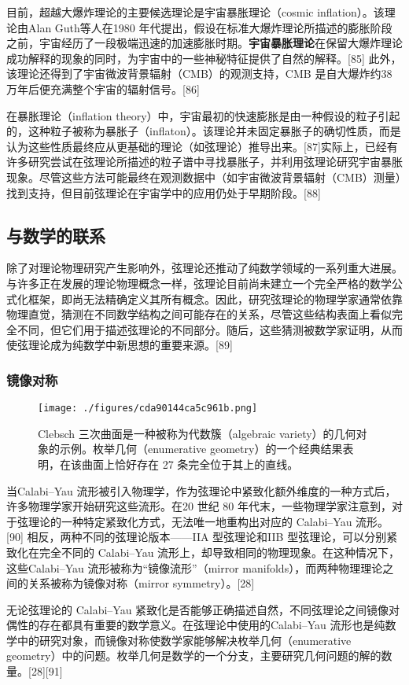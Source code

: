 目前，超越大爆炸理论的主要候选理论是宇宙暴胀理论（cosmic inflation）。该理论由Alan Guth等人在1980 年代提出，假设在标准大爆炸理论所描述的膨胀阶段之前，宇宙经历了一段极端迅速的加速膨胀时期。\textbf{宇宙暴胀理论}在保留大爆炸理论成功解释的现象的同时，为宇宙中的一些神秘特征提供了自然的解释。[85] 此外，该理论还得到了宇宙微波背景辐射（CMB）的观测支持，CMB 是自大爆炸约38 万年后便充满整个宇宙的辐射信号。[86]

在暴胀理论（inflation theory）中，宇宙最初的快速膨胀是由一种假设的粒子引起的，这种粒子被称为暴胀子（inflaton）。该理论并未固定暴胀子的确切性质，而是认为这些性质最终应从更基础的理论（如弦理论）推导出来。[87]实际上，已经有许多研究尝试在弦理论所描述的粒子谱中寻找暴胀子，并利用弦理论研究宇宙暴胀现象。尽管这些方法可能最终在观测数据中（如宇宙微波背景辐射（CMB）测量）找到支持，但目前弦理论在宇宙学中的应用仍处于早期阶段。[88]
\subsection{与数学的联系}
除了对理论物理研究产生影响外，弦理论还推动了纯数学领域的一系列重大进展。与许多正在发展的理论物理概念一样，弦理论目前尚未建立一个完全严格的数学公式化框架，即尚无法精确定义其所有概念。因此，研究弦理论的物理学家通常依靠物理直觉，猜测在不同数学结构之间可能存在的关系，尽管这些结构表面上看似完全不同，但它们用于描述弦理论的不同部分。随后，这些猜测被数学家证明，从而使弦理论成为纯数学中新思想的重要来源。[89]
\subsubsection{镜像对称}
\begin{figure}[ht]
\centering
\texttt{[image: ./figures/cda90144ca5c961b.png]}
\caption{Clebsch 三次曲面是一种被称为代数簇（algebraic variety）的几何对象的示例。枚举几何（enumerative geometry）的一个经典结果表明，在该曲面上恰好存在 27 条完全位于其上的直线。} \label{fig_String_11}
\end{figure}
当Calabi–Yau 流形被引入物理学，作为弦理论中紧致化额外维度的一种方式后，许多物理学家开始研究这些流形。在20 世纪 80 年代末，一些物理学家注意到，对于弦理论的一种特定紧致化方式，无法唯一地重构出对应的 Calabi–Yau 流形。[90] 相反，两种不同的弦理论版本——IIA 型弦理论和IIB 型弦理论，可以分别紧致化在完全不同的 Calabi–Yau 流形上，却导致相同的物理现象。在这种情况下，这些Calabi–Yau 流形被称为“镜像流形”（mirror manifolds），而两种物理理论之间的关系被称为镜像对称（mirror symmetry）。[28]

无论弦理论的 Calabi–Yau 紧致化是否能够正确描述自然，不同弦理论之间镜像对偶性的存在都具有重要的数学意义。在弦理论中使用的Calabi–Yau 流形也是纯数学中的研究对象，而镜像对称使数学家能够解决枚举几何（enumerative geometry）中的问题。枚举几何是数学的一个分支，主要研究几何问题的解的数量。[28][91]

